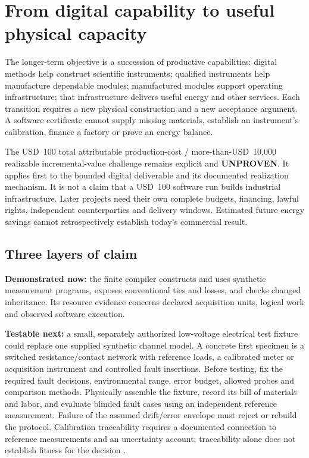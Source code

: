 \section{From digital capability to useful physical capacity}
\label{sec:physical-progression}
The longer-term objective is a succession of productive capabilities: digital methods help construct scientific instruments; qualified instruments help manufacture dependable modules; manufactured modules support operating infrastructure; that infrastructure delivers useful energy and other services. Each transition requires a new physical construction and a new acceptance argument. A software certificate cannot supply missing materials, establish an instrument's calibration, finance a factory or prove an energy balance.

The USD~100 total attributable production-cost / more-than-USD~10,000 realizable incremental-value challenge remains explicit and \textbf{UNPROVEN}. It applies first to the bounded digital deliverable and its documented realization mechanism. It is not a claim that a USD~100 software run builds industrial infrastructure. Later projects need their own complete budgets, financing, lawful rights, independent counterparties and delivery windows. Estimated future energy savings cannot retrospectively establish today's commercial result.

\subsection{Three layers of claim}
\textbf{Demonstrated now:} the finite compiler constructs and uses synthetic measurement programs, exposes conventional ties and losses, and checks changed inheritance. Its resource evidence concerns declared acquisition units, logical work and observed software execution.

\textbf{Testable next:} a small, separately authorized low-voltage electrical test fixture could replace one supplied synthetic channel model. A concrete first specimen is a switched resistance/contact network with reference loads, a calibrated meter or acquisition instrument and controlled fault insertions. Before testing, fix the required fault decisions, environmental range, error budget, allowed probes and comparison methods. Physically assemble the fixture, record its bill of materials and labor, and evaluate blinded fault cases using an independent reference measurement. Failure of the assumed drift/error envelope must reject or rebuild the protocol. Calibration traceability requires a documented connection to reference measurements and an uncertainty account; traceability alone does not establish fitness for the decision \citep{nisttraceability}.

